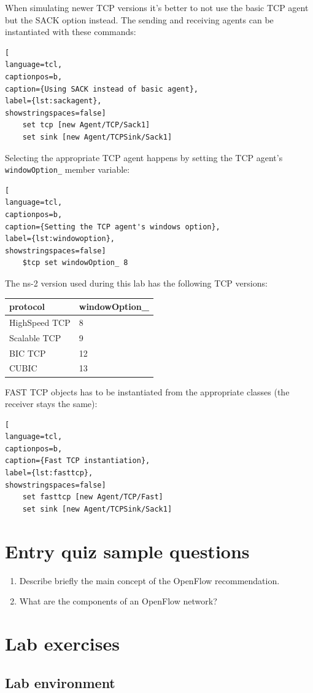 \documentclass[a4paper]{article}
\begin{document}
When simulating newer TCP versions it's better to not use the basic TCP agent but the SACK option instead. The sending and receiving agents can be instantiated with these commands:

\begin{lstlisting}[
language=tcl,
captionpos=b,
caption={Using SACK instead of basic agent},
label={lst:sackagent},
showstringspaces=false]
    set tcp [new Agent/TCP/Sack1]
    set sink [new Agent/TCPSink/Sack1]
\end{lstlisting}


Selecting the appropriate TCP agent happens by setting the TCP agent's \verb!windowOption_! member variable:

\begin{lstlisting}[
language=tcl,
captionpos=b,
caption={Setting the TCP agent's windows option},
label={lst:windowoption},
showstringspaces=false]
    $tcp set windowOption_ 8
\end{lstlisting}

The ns-2 version used during this lab has the following TCP versions:

\begin{tabular}{|l|l|}
\hline
\cellcolor{blue!25} \textbf{protocol} & \cellcolor{blue!25} \textbf{windowOption\_} \\\hline
HighSpeed TCP &  8 \\\hline
Scalable TCP  &  9 \\\hline
BIC TCP     & 12 \\\hline
CUBIC  & 13  \\\hline
\end{tabular}

\hfill \break
FAST TCP objects has to be instantiated from the appropriate classes (the receiver stays the same):

\begin{lstlisting}[
language=tcl,
captionpos=b,
caption={Fast TCP instantiation},
label={lst:fasttcp},
showstringspaces=false]
    set fasttcp [new Agent/TCP/Fast]
    set sink [new Agent/TCPSink/Sack1]
\end{lstlisting}


\appendix

\section{Entry quiz sample questions}

\begin{enumerate}
    \item Describe briefly the main concept of the OpenFlow recommendation.
    \item What are the components of an OpenFlow network?
\end{enumerate}

\section{Lab exercises}

\subsection{Lab environment}
\end{document}
